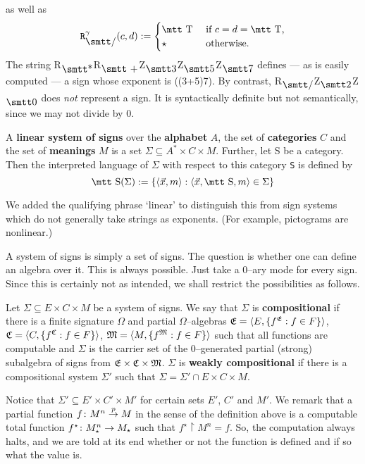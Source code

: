 as well as
\begin{equation}
\mbox{\tt R}^{\gamma}_{\mbox{\smtt\symbol{47}}}(c,d) :=
    \begin{cases}
    \mbox{\mtt T} & \text{ if $c = d = \mbox{\mtt T}$,} \\
    \star & \text{ otherwise.}
    \end{cases}
\end{equation}
The string 
{\mtt R$_{\mbox{\smtt\symbol{42}}}$R$_{\mbox{\smtt +}}%
$Z$_{\sdrei}$Z$_{\sfuenf}$Z$_{\ssieben}$}
defines --- as is easily computed --- a sign whose exponent is
{\mtt ((3+5)7)}. By contrast, 
{\mtt R$_{\mbox{\smtt\symbol{47}}}$Z$_{\szwei}$Z$_{\snull}$}
does {\it not\/} represent a sign. It is syntactically definite
but not semantically, since we may not divide by 0.
\begin{defn}
A \textbf{linear system of signs} over the \textbf{alphabet} $A$,
the set of \textbf{categories} $C$ and the set of \textbf{meanings} 
$M$ is a set $\Sigma \subseteq A^{\ast}\times C\times M$. Further,
let {\mtt S} be a category. Then the interpreted language of
$\Sigma$ with respect to this category {\tt S} is defined by
\begin{equation}
\mbox{\mtt S}(\Sigma) :=
\{\auf \vec{x}, m\zu : \auf \vec{x}, \mbox{\mtt S}, m\zu
\in \Sigma\} 
\end{equation}
\end{defn}
We added the qualifying phrase `linear' to distinguish this
from sign systems which do not generally take strings as
exponents. (For example, pictograms are nonlinear.)

A system of signs is simply a set of signs. The question is
whether one can define an algebra over it. This is always
possible. Just take a 0--ary mode for every sign. Since this
is certainly not as intended, we shall restrict the possibilities
as follows.
\begin{defn}
Let $\Sigma \subseteq E\times C\times M$ be a
system of signs. We say that $\Sigma$ is
\textbf{compositional} if there is a finite signature
$\Omega$ and partial $\Omega$--algebras
$\mathfrak{E} = \langle E, \{ f^{\mathfrak{E}} : f \in F\}\rangle$,
$\mathfrak{C} = \langle C, \{ f^{\mathfrak{C}} : f \in F\}\rangle$,
$\mathfrak{M} = \langle M, \{ f^{\mathfrak{M}} : f \in F\}\rangle$ such that all
functions are computable and $\Sigma$ is the carrier set 
of the 0--generated partial (strong) subalgebra of  
signs from $\mathfrak{E} \times \mathfrak{C} \times \mathfrak{M}$. $\Sigma$ is
\textbf{weakly compositional} if there is  a compositional
system $\Sigma'$ such that $\Sigma = \Sigma' \cap E \times 
C \times M$.
\end{defn}
Notice that $\Sigma' \subseteq E' \times C' \times M'$ for certain 
sets $E'$, $C'$ and $M'$. We remark that a partial function 
$f \colon M^n \stackrel{p}{\rightarrow} M$ in the sense of the definition 
above is a computable total function
$f^{\star} \colon M_{\star}^n \rightarrow M_{\star}$ such that
$f^{\star} \restriction M^n = f$. So, the computation always halts,
and we are told at its end whether or not the function is defined
and if so what the value is.

